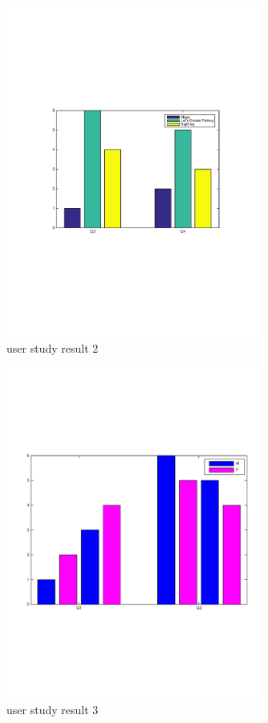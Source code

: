 \begin{figure}
  \includegraphics[width=0.75\textwidth]{f8.pdf}
\caption{user study result 2}
\label{fig:1}       %
\end{figure}

\begin{figure}
  \includegraphics[width=0.75\textwidth]{f9.pdf}
\caption{user study result 3}
\label{fig:1}       %
\end{figure}

